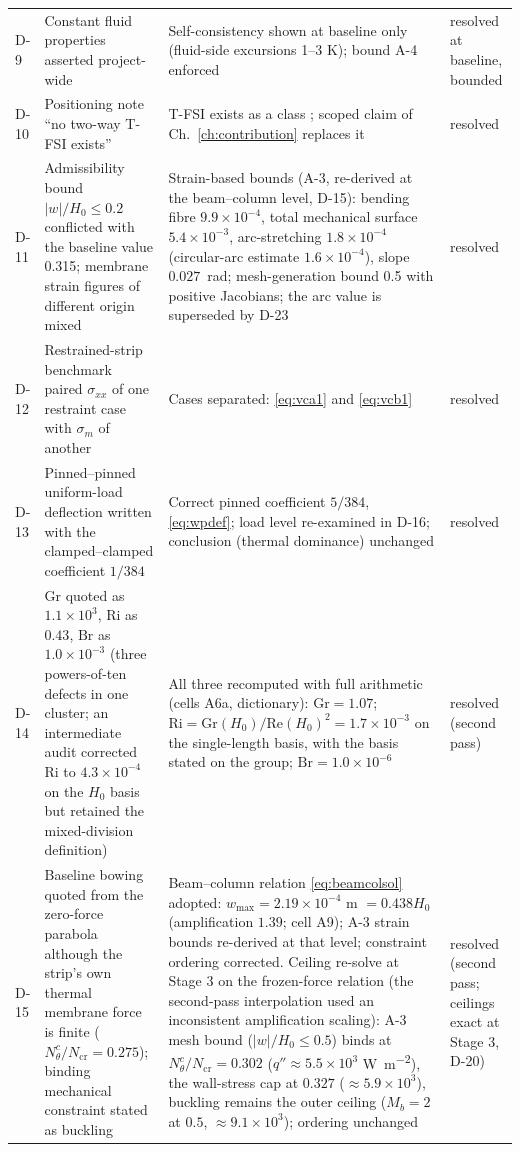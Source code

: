 \begin{longtable}{p{1cm}p{4.6cm}p{5.2cm}p{3.2cm}}
D-9 & Constant fluid properties asserted project-wide & Self-consistency shown at baseline only (fluid-side excursions 1--3 K); bound A-4 enforced & resolved at baseline, bounded \\
D-10 & Positioning note ``no two-way T-FSI exists'' & T-FSI exists as a class \cite{kumar2026thermo,saleh2025laminar}; scoped claim of Ch.~\ref{ch:contribution} replaces it & resolved \\
D-11 & Admissibility bound $|w|/H_0\le0.2$ conflicted with the baseline value 0.315; membrane strain figures of different origin mixed & Strain-based bounds (A-3, re-derived at the beam--column level, D-15): bending fibre $9.9\times10^{-4}$, total mechanical surface $5.4\times10^{-3}$, arc-stretching $1.8\times10^{-4}$ (circular-arc estimate $1.6\times10^{-4}$), slope $0.027$~rad; mesh-generation bound 0.5 with positive Jacobians; the arc value is superseded by D-23 & resolved \\
D-12 & Restrained-strip benchmark paired $\sigma_{xx}$ of one restraint case with $\sigma_m$ of another & Cases separated: \eqref{eq:vca1} and \eqref{eq:vcb1} & resolved \\
D-13 & Pinned--pinned uniform-load deflection written with the clamped--clamped coefficient $1/384$ & Correct pinned coefficient $5/384$, \eqref{eq:wpdef}; load level re-examined in D-16; conclusion (thermal dominance) unchanged & resolved \\
D-14 & $\mathrm{Gr}$ quoted as $1.1\times10^3$, $\mathrm{Ri}$ as $0.43$, $\mathrm{Br}$ as $1.0\times10^{-3}$ (three powers-of-ten defects in one cluster; an intermediate audit corrected $\mathrm{Ri}$ to $4.3\times10^{-4}$ on the $H_0$ basis but retained the mixed-division definition) & All three recomputed with full arithmetic (cells A6a, dictionary): $\mathrm{Gr}=1.07$; $\mathrm{Ri}=\mathrm{Gr}(H_0)/\mathrm{Re}(H_0)^2=1.7\times10^{-3}$ on the single-length basis, with the basis stated on the group; $\mathrm{Br}=1.0\times10^{-6}$ & resolved (second pass) \\
D-15 & Baseline bowing quoted from the zero-force parabola although the strip's own thermal membrane force is finite ($N_\theta^c/N_{\mathrm{cr}}=0.275$); binding mechanical constraint stated as buckling & Beam--column relation \eqref{eq:beamcolsol} adopted: $w_{\max}=2.19\times10^{-4}$ m $=0.438H_0$ (amplification $1.39$; cell A9); A-3 strain bounds re-derived at that level; constraint ordering corrected. Ceiling re-solve at Stage 3 on the frozen-force relation (the second-pass interpolation used an inconsistent amplification scaling): A-3 mesh bound ($|w|/H_0\le0.5$) binds at $N_\theta^c/N_{\mathrm{cr}}=0.302$ ($q''\approx5.5\times10^3$ \si{\watt\per\square\metre}), the wall-stress cap at $0.327$ ($\approx5.9\times10^3$), buckling remains the outer ceiling ($M_b=2$ at $0.5$, $\approx9.1\times10^3$); ordering unchanged & resolved (second pass; ceilings exact at Stage 3, D-20) \\

\end{longtable}
